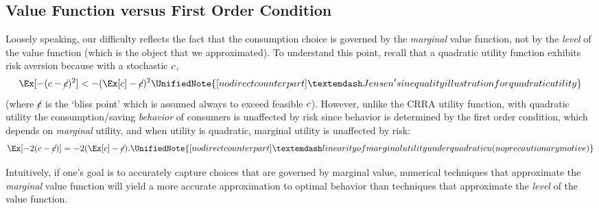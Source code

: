 \hypertarget{value-function-versus-first-order-condition}{}
\subsection{Value Function versus First Order Condition}\label{subsec:vVsuP}

Loosely speaking, our difficulty reflects the fact that the
consumption choice is governed by the \textit{marginal} value function,
not by the \textit{level} of the value function (which is the object that
we approximated).  To understand this point, recall that a quadratic
utility function
exhibits risk aversion because with a stochastic $c$,
\begin{equation}
  \Ex[-(c - \cancel{c})^{2}] < - (\Ex[c] - \cancel{c})^{2}
\UnifiedNote{[no direct counterpart] — Jensen's inequality illustration for quadratic utility}
\end{equation}
(where $\cancel{c}$ is the `bliss point' which is assumed always to exceed feasible $c$). However, unlike the CRRA utility function,
with quadratic utility the consumption/saving \textit{behavior} of consumers
is unaffected by risk since behavior is determined by the first order condition, which
depends on \textit{marginal} utility, and when utility is quadratic, marginal utility is unaffected
by risk:
\begin{equation}
  \Ex[-2(c - \cancel{c})] = - 2(\Ex[c] - \cancel{c}).
\UnifiedNote{[no direct counterpart] — linearity of marginal utility under quadratic u (no precautionary motive)}
\end{equation}

Intuitively, if one's goal is to accurately capture choices
that are governed by marginal value,
numerical techniques that approximate the \textit{marginal} value
function will yield a more accurate approximation to
optimal behavior than techniques that approximate the \textit{level}
of the value function.

